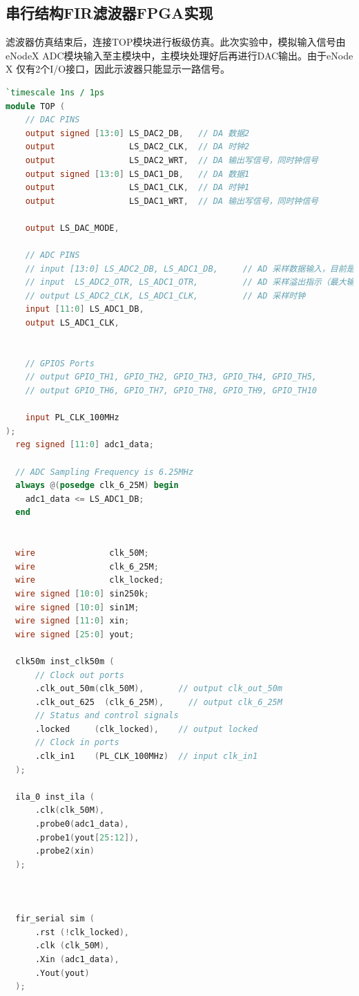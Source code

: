 \subsection{串行结构FIR滤波器FPGA实现}
滤波器仿真结束后，连接TOP模块进行板级仿真。此次实验中，模拟输入信号由eNodeX ADC模块输入至主模块中，主模块处理好后再进行DAC输出。由于eNode X 仅有2个I/O接口，因此示波器只能显示一路信号。
\begin{lstlisting}[language=verilog,caption={TOP模块}]
`timescale 1ns / 1ps
module TOP (
    // DAC PINS
    output signed [13:0] LS_DAC2_DB,   // DA 数据2
    output               LS_DAC2_CLK,  // DA 时钟2
    output               LS_DAC2_WRT,  // DA 输出写信号，同时钟信号
    output signed [13:0] LS_DAC1_DB,   // DA 数据1
    output               LS_DAC1_CLK,  // DA 时钟1
    output               LS_DAC1_WRT,  // DA 输出写信号，同时钟信号

    output LS_DAC_MODE,

    // ADC PINS
    // input [13:0] LS_ADC2_DB, LS_ADC1_DB,     // AD 采样数据输入，目前是用的12bit ADC
    // input  LS_ADC2_OTR, LS_ADC1_OTR,         // AD 采样溢出指示（最大输入幅??2V??
    // output LS_ADC2_CLK, LS_ADC1_CLK,         // AD 采样时钟
    input [11:0] LS_ADC1_DB,
    output LS_ADC1_CLK,


    // GPIOS Ports
    // output GPIO_TH1, GPIO_TH2, GPIO_TH3, GPIO_TH4, GPIO_TH5,
    // output GPIO_TH6, GPIO_TH7, GPIO_TH8, GPIO_TH9, GPIO_TH10

    input PL_CLK_100MHz
);
  reg signed [11:0] adc1_data;

  // ADC Sampling Frequency is 6.25MHz
  always @(posedge clk_6_25M) begin
    adc1_data <= LS_ADC1_DB;
  end


  wire               clk_50M;
  wire               clk_6_25M;
  wire               clk_locked;
  wire signed [10:0] sin250k;
  wire signed [10:0] sin1M;
  wire signed [11:0] xin;
  wire signed [25:0] yout;

  clk50m inst_clk50m (
      // Clock out ports
      .clk_out_50m(clk_50M),       // output clk_out_50m
      .clk_out_625  (clk_6_25M),     // output clk_6_25M
      // Status and control signals
      .locked     (clk_locked),    // output locked
      // Clock in ports
      .clk_in1    (PL_CLK_100MHz)  // input clk_in1
  );

  ila_0 inst_ila (
      .clk(clk_50M),
      .probe0(adc1_data),
      .probe1(yout[25:12]),
      .probe2(xin)
  );



  fir_serial sim (
      .rst (!clk_locked),
      .clk (clk_50M),
      .Xin (adc1_data),
      .Yout(yout)
  );


\end{lstlisting}
